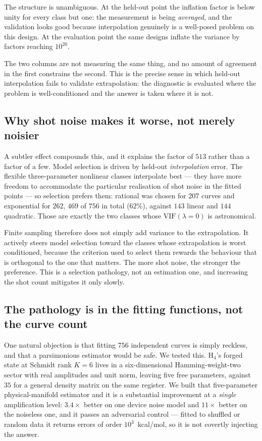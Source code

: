 \documentclass[aps,prx,twocolumn,superscriptaddress,nofootinbib,floatfix]{revtex4-2}
\begin{document}
The structure is unambiguous. At the held-out point the inflation factor
is below unity for every class but one: the measurement is being
\emph{averaged}, and the validation looks good because interpolation
genuinely is a well-posed problem on this design. At the evaluation point
the same designs inflate the variance by factors reaching $10^{20}$.

The two columns are not measuring the same thing, and no amount of
agreement in the first constrains the second. This is the precise sense in
which held-out interpolation fails to validate extrapolation: the
diagnostic is evaluated where the problem is well-conditioned and the
answer is taken where it is not.

\subsection{Why shot noise makes it worse, not merely noisier}

A subtler effect compounds this, and it explains the factor of $513$
rather than a factor of a few. Model selection is driven by held-out
\emph{interpolation} error. The flexible three-parameter nonlinear classes
interpolate best --- they have more freedom to accommodate the particular
realisation of shot noise in the fitted points --- so selection prefers
them: rational was chosen for $207$ curves and exponential for $262$,
$469$ of $756$ in total ($62\%$), against $143$ linear and $144$
quadratic. Those are exactly the two classes whose
$\mathrm{VIF}(\lambda{=}0)$ is astronomical.

Finite sampling therefore does not simply add variance to the
extrapolation. It actively steers model selection toward the classes whose
extrapolation is worst conditioned, because the criterion used to select
them rewards the behaviour that is orthogonal to the one that matters. The
more shot noise, the stronger the preference. This is a selection
pathology, not an estimation one, and increasing the shot count mitigates
it only slowly.

\subsection{The pathology is in the fitting functions, not the curve count}

One natural objection is that fitting $756$ independent curves is simply
reckless, and that a parsimonious estimator would be safe. We tested this.
H$_4$'s forged state at Schmidt rank $K=6$ lives in a six-dimensional
Hamming-weight-two sector with real amplitudes and unit norm, leaving five
free parameters, against $35$ for a general density matrix on the same
register. We built that five-parameter physical-manifold estimator and it
is a substantial improvement at a \emph{single} amplification level:
$3.4\times$ better on one device noise model and $11\times$ better on the
noiseless one, and it passes an adversarial control --- fitted to shuffled
or random data it returns errors of order $10^{3}$~kcal/mol, so it is not
covertly injecting the answer.
\end{document}
